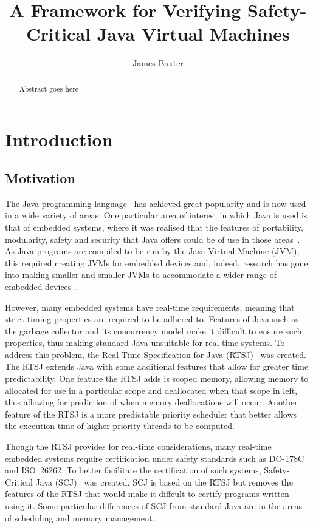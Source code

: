 \documentclass[a4paper,10pt]{report}
\title{A Framework for Verifying Safety-Critical Java Virtual Machines}
\author{James Baxter}
\date{}
\begin{document}
\maketitle

\begin{abstract}
  Abstract goes here
\end{abstract}

\tableofcontents

\chapter{Introduction}


\section{Motivation}

The Java programming language~\cite{gosling2013} has achieved great
popularity and is now used in a wide variety of areas.
One particular area of interest in which Java is used is that of
embedded systems, where it was realised that the features of
portability, modularity, safety and security that Java offers could be
of use in those areas~\cite{mulchandani1998}.
As Java programs are compiled to be run by the Java Virtual Machine
(JVM), this required creating JVMs for embedded devices and, indeed,
research has gone into making smaller and smaller JVMs to accommodate
a wider range of embedded devices~\cite{caska2011,thomm2010}.

However, many embedded systems have real-time requirements, meaning
that strict timing properties are required to be adhered to.
Features of Java such as the garbage collector and its concurrency
model make it difficult to ensure such properties, thus making
standard Java unsuitable for real-time systems.
To address this problem, the Real-Time Specification for Java
(RTSJ)~\cite{gosling2000} was created.
The RTSJ extends Java with some additional features that allow for
greater time predictability.
One feature the RTSJ adds is scoped memory, allowing memory to
allocated for use in a particular scope and deallocated when that
scope in left, thus allowing for prediction of when memory
deallocations will occur.
Another feature of the RTSJ is a more predictable priority scheduler
that better allows the execution time of higher priority threads to be
computed.

Though the RTSJ provides for real-time considerations, many real-time
embedded systems require certification under safety standards such as
\mbox{DO-178C} and ISO~26262.
To better facilitate the certification of such systems,
Safety-Critical Java (SCJ)~\cite{locke2013} was created.
SCJ is based on the RTSJ but removes the features of the RTSJ that
would make it diffcult to certify programs written using it.
Some particular differences of SCJ from standard Java are in the areas
of scheduling and memory management.
\end{document}
